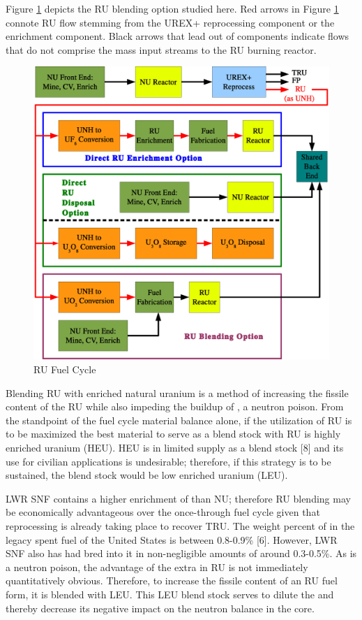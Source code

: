 Figure \ref{1g_fig08} depicts the RU blending option studied here.  Red arrows in Figure \ref{1g_fig08} 
connote RU flow stemming from the UREX+ reprocessing component or the enrichment component.  Black arrows 
that lead out of components indicate flows that do not comprise the mass input streams to the RU burning reactor.  
\begin{figure}[htbp]
\caption{RU Fuel Cycle}
\label{1g_fig08}
\begin{center}
\includegraphics[scale=0.5]{one_group_method/figs/Fig08.eps}
\end{center}
\end{figure}
Blending RU with enriched natural uranium is a method of increasing the fissile content of the RU while 
also impeding the buildup of , a neutron poison.  From the standpoint of the fuel cycle material 
balance alone, if the utilization of RU is to be maximized the best material to serve as a blend stock with 
RU is highly enriched uranium (HEU).  HEU is in limited supply as a blend stock [8] and its use for civilian 
applications is undesirable; therefore, if this strategy is to be sustained, the blend stock would be low 
enriched uranium (LEU).  

LWR SNF contains a higher enrichment of  than NU; therefore RU blending may be economically 
advantageous over the once-through fuel cycle given that reprocessing is already taking place to recover 
TRU. The weight percent of  in the legacy spent fuel of the United States is between 0.8-0.9\% [6].  
However, LWR SNF also has had  bred into it in non-negligible amounts of around 0.3-0.5\%.  
As  is a neutron poison, the advantage of the extra  in RU is not immediately 
quantitatively obvious.  Therefore, to increase the fissile content of an RU fuel form, it is blended 
with LEU. This LEU blend stock serves to dilute the  and thereby decrease its negative 
impact on the neutron balance in the core. 

